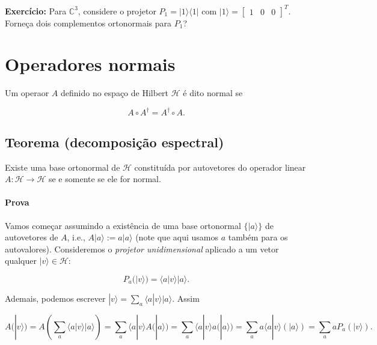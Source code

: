 \documentclass[11pt]{article}
\begin{document}
\textbf{Exercício:} Para \(\mathbb{C}^{3}\), considere o projetor
\(P_{1}=|1\rangle\langle 1|\) com
\(|1\rangle=\begin{bmatrix} 1 & 0 & 0 \end{bmatrix}^{T}\). Forneça dois
complementos ortonormais para \(P_{1}\)?

    \section{Operadores normais}\label{operadores-normais}

Um operaor \(A\) definido no espaço de Hilbert \(\mathcal{H}\) é dito
normal se

\begin{equation}
A\circ A^{\dagger} = A^{\dagger}\circ A.
\end{equation}

\subsection{Teorema (decomposição
espectral)}\label{teorema-decomposiuxe7uxe3o-espectral}

Existe uma base ortonormal de \(\mathcal{H}\) constituída por
autovetores do operador linear \(A:\mathcal{H}\rightarrow\mathcal{H}\)
se e somente se ele for normal.

\paragraph{Prova}\label{prova}

Vamos começar assumindo a existência de uma base ortonormal
\(\{|a\rangle\}\) de autovetores de \(A\), i.e.,
\(A|a\rangle := a|a\rangle\) (note que aqui usamos \(a\) também para os
autovalores). Consideremos o \emph{projetor unidimensional} aplicado a
um vetor qualquer \(|v\rangle\in\mathcal{H}\):

\begin{equation}
P_{a}(|v\rangle)=\langle a|v\rangle |a\rangle.
\end{equation}

Ademais, podemos escrever
\(|v\rangle=\sum_{a}\langle a|v\rangle|a\rangle\). Assim

\begin{equation}
A(|v\rangle) = A(\sum_{a}\langle a|v\rangle|a\rangle) = \sum_{a}\langle a|v\rangle A(|a\rangle) = \sum_{a}\langle a|v\rangle a(|a\rangle) = \sum_{a} a\langle a|v\rangle(|a\rangle) = \sum_{a} aP_{a}(|v\rangle).
\end{equation}
\end{document}

